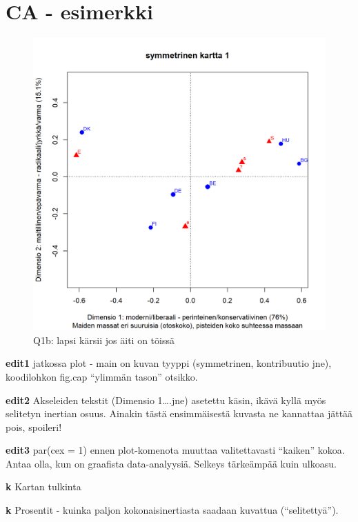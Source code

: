 \documentclass[
  finnish,
]{book}
\begin{document}
\hypertarget{ca---esimerkki}{%
\section{CA - esimerkki}\label{ca---esimerkki}}

\begin{figure}

{\centering \includegraphics[width=0.9\linewidth]{JH_capaper_files/figure-latex/simpleCA1map1-1} 

}

\caption{Q1b: lapsi kärsii jos äiti on töissä}\label{fig:simpleCA1map1}
\end{figure}

\textbf{edit1} jatkossa plot - main on kuvan tyyppi (symmetrinen,
kontribuutio jne), koodilohkon fig.cap ``ylimmän tason'' otsikko.

\textbf{edit2} Akseleiden tekstit (Dimensio 1\ldots.jne) asetettu käsin,
ikävä kyllä myös selitetyn inertian osuus. Ainakin tästä ensimmäisestä
kuvasta ne kannattaa jättää pois, spoileri!

\textbf{edit3} par(cex = 1) ennen plot-komenota muuttaa valitettavasti
``kaiken'' kokoa. Antaa olla, kun on graafista data-analyysiä. Selkeys
tärkeämpää kuin ulkoasu.

\textbf{k} Kartan tulkinta

\textbf{k} Prosentit - kuinka paljon kokonaisinertiasta saadaan kuvattua
(``selitettyä'').
\end{document}
